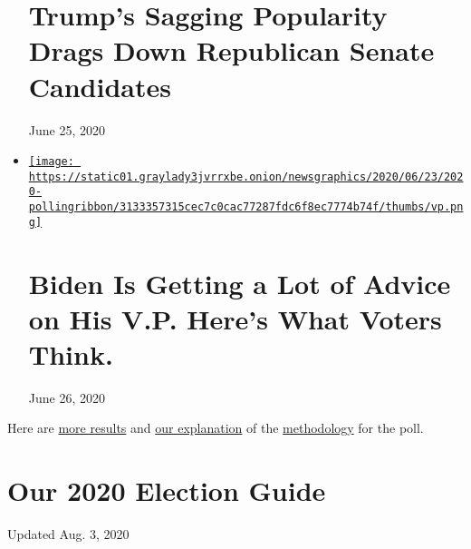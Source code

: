 \begin{itemize}
{  \section{Trump's Sagging Popularity Drags Down Republican Senate
  Candidates}\label{trumps-sagging-popularity-drags-down-republican-senate-candidates}}

  June 25, 2020
\item
  \href{https://www.nytimes3xbfgragh.onion/2020/06/26/us/politics/biden-vice-president-voters.html}{\texttt{[image: https://static01.graylady3jvrrxbe.onion/newsgraphics/2020/06/23/2020-pollingribbon/3133357315cec7c0cac77287fdc6f8ec7774b74f/thumbs/vp.png]}}

  \href{https://www.nytimes3xbfgragh.onion/2020/06/26/us/politics/biden-vice-president-voters.html}{}

  \hypertarget{biden-is-getting-a-lot-of-advice-on-his-vp-heres-what-voters-think}{%
  \section{Biden Is Getting a Lot of Advice on His V.P. Here's What
  Voters
  Think.}\label{biden-is-getting-a-lot-of-advice-on-his-vp-heres-what-voters-think}}

  June 26, 2020
\end{itemize}

Here are
\href{https://int.graylady3jvrrxbe.onion/data/documenttools/crosstabs0624release/18307fed6cb2dc5a/full.pdf}{more
results} and
\href{https://www.nytimes3xbfgragh.onion/2020/06/23/upshot/poll-2020-election-method.html}{our
explanation} of the
\href{https://int.graylady3jvrrxbe.onion/data/documenttools/nyt-siena-poll-methodology-june-2020/f6f533b4d07f4cbe/full.pdf}{methodology}
for the poll.

\hypertarget{our-2020-election-guide}{%
\section{Our 2020 Election Guide}\label{our-2020-election-guide}}

Updated Aug. 3, 2020

